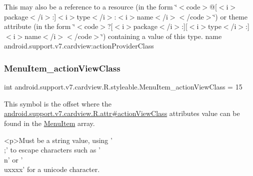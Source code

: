 This may also be a reference to a resource (in the form \char`\"{}$<$code$>$@\mbox{[}$<$i$>$package$<$/i$>$\+:\mbox{]}$<$i$>$type$<$/i$>$\+:$<$i$>$name$<$/i$>$$<$/code$>$\char`\"{}) or theme attribute (in the form \char`\"{}$<$code$>$?\mbox{[}$<$i$>$package$<$/i$>$\+:\mbox{]}\mbox{[}$<$i$>$type$<$/i$>$\+:\mbox{]}$<$i$>$name$<$/i$>$$<$/code$>$\char`\"{}) containing a value of this type.  name android.\+support.\+v7.\+cardview\+:action\+Provider\+Class \mbox{\label{classandroid_1_1support_1_1v7_1_1cardview_1_1R_1_1styleable_a68225a0f12a88cf1ba29787d1c3653f7}} 
\subsubsection{\texorpdfstring{Menu\+Item\+\_\+action\+View\+Class}{MenuItem\_actionViewClass}}
{\footnotesize\ttfamily int android.\+support.\+v7.\+cardview.\+R.\+styleable.\+Menu\+Item\+\_\+action\+View\+Class = 15\hspace{0.3cm}{\ttfamily [static]}}

This symbol is the offset where the \hyperlink{classandroid_1_1support_1_1v7_1_1cardview_1_1R_1_1attr_ad68d1808a3fbd15f5824cff01263ba9e}{android.\+support.\+v7.\+cardview.\+R.\+attr\#action\+View\+Class} attribute\textquotesingle{}s value can be found in the \hyperlink{classandroid_1_1support_1_1v7_1_1cardview_1_1R_1_1styleable_a0a483b830af809d94b22d4901e758447}{Menu\+Item} array.

\begin{DoxyVerb}      <p>Must be a string value, using '\\;' to escape characters such as '\\n' or '\\uxxxx' for a unicode character.
\end{DoxyVerb}
 

